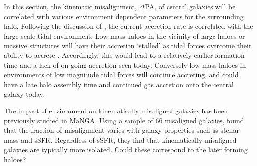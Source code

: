 In this section, the kinematic misalignment, $\Delta$PA, of central galaxies will be correlated with various environment dependent parameters for the surrounding halo. Following the discussion of \citet{hahn2009}, the current accretion rate is correlated with the large-scale tidal environment. Low-mass haloes in the vicinity of large haloes or massive structures will have their accretion `stalled' as tidal forces overcome their ability to accrete \citep[see also;][]{wang2007,dalal2008,lacerna2011}. Accordingly, this would lead to a relatively earlier formation time and a lack of on-going accretion seen today. Conversely low-mass haloes in environments of low magnitude tidal forces will continue accreting, and could have a late halo assembly time and continued gas accretion onto the central galaxy today. 

The impact of environment on kinematically misaligned galaxies has been previously studied in MaNGA. Using a sample of 66 misaligned galaxies, \citet{jin2016} found that the fraction of misalignment varies with galaxy properties such as stellar mass and sSFR. Regardless of sSFR, they find that kinematically misaligned galaxies are typically more isolated. Could these correspond to the later forming haloes?

